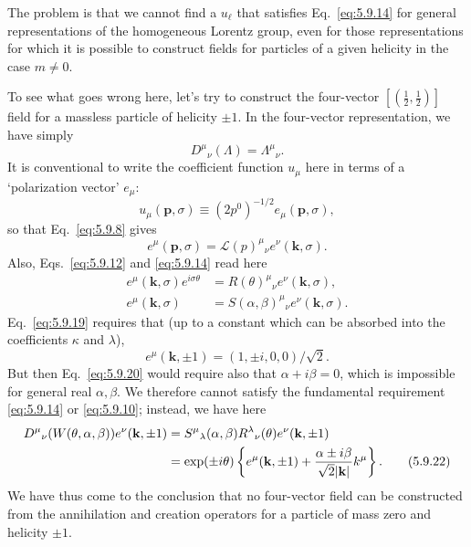 The problem is that we cannot find a $u_\ell$ that satisfies Eq.~\eqref{eq:5.9.14} for
general representations of the homogeneous Lorentz group, even for those
representations for which it is possible to construct fields for particles of
a given helicity in the case $m\neq0$.

To see what goes wrong here, let's try to construct the four-vector
$[(\tfrac12,\tfrac12)]$ field for a massless particle of helicity $\pm1$. In
the four-vector representation, we have simply
\[
D^\mu{}_\nu(\Lambda)=\Lambda^\mu{}_\nu.
\]
It is conventional to write the coefficient function $u_\mu$ here in terms of
a `polarization vector' $e_\mu$:
\begin{equation}
u_\mu(\mathbf p,\sigma)\equiv(2p^0)^{-1/2}e_\mu(\mathbf p,\sigma),
\tag{5.9.17}\label{eq:5.9.17}
\end{equation}
so that Eq.~\eqref{eq:5.9.8} gives
\begin{equation}
e^\mu(\mathbf p,\sigma)=\mathcal L(p)^\mu{}_\nu e^\nu(\mathbf k,\sigma).
\tag{5.9.18}\label{eq:5.9.18}
\end{equation}
Also, Eqs.~\eqref{eq:5.9.12} and \eqref{eq:5.9.14} read here
\begin{align}
e^\mu(\mathbf k,\sigma)e^{i\sigma\theta}
&=R(\theta)^\mu{}_\nu e^\nu(\mathbf k,\sigma),
\tag{5.9.19}\label{eq:5.9.19}\\
e^\mu(\mathbf k,\sigma)&=S(\alpha,\beta)^\mu{}_\nu
e^\nu(\mathbf k,\sigma).
\tag{5.9.20}\label{eq:5.9.20}
\end{align}
Eq.~\eqref{eq:5.9.19} requires that (up to a constant which can be absorbed into the
coefficients $\kappa$ and $\lambda$),
\begin{equation}
e^\mu(\mathbf k,\pm1)=(1,\pm i,0,0)/\sqrt2.
\tag{5.9.21}\label{eq:5.9.21}
\end{equation}
But then Eq.~\eqref{eq:5.9.20} would require also that $\alpha+i\beta=0$, which is
impossible for general real $\alpha,\beta$. We therefore cannot satisfy the
fundamental requirement \eqref{eq:5.9.14} or \eqref{eq:5.9.10}; instead, we have here
\begin{align}
D^\mu{}_\nu(W(\theta,\alpha,\beta))e^\nu(\mathbf k,\pm1)
&=S^\mu{}_\lambda(\alpha,\beta)R^\lambda{}_\nu(\theta)
e^\nu(\mathbf k,\pm1)
\notag\\
&=\exp(\pm i\theta)\left\{e^\mu(\mathbf k,\pm1)
+\frac{\alpha\pm i\beta}{\sqrt{2}|\mathbf k|}k^\mu\right\}.
\tag{5.9.22}\label{eq:5.9.22}
\end{align}
We have thus come to the conclusion that no four-vector field can be
constructed from the annihilation and creation operators for a particle of
mass zero and helicity $\pm1$.

